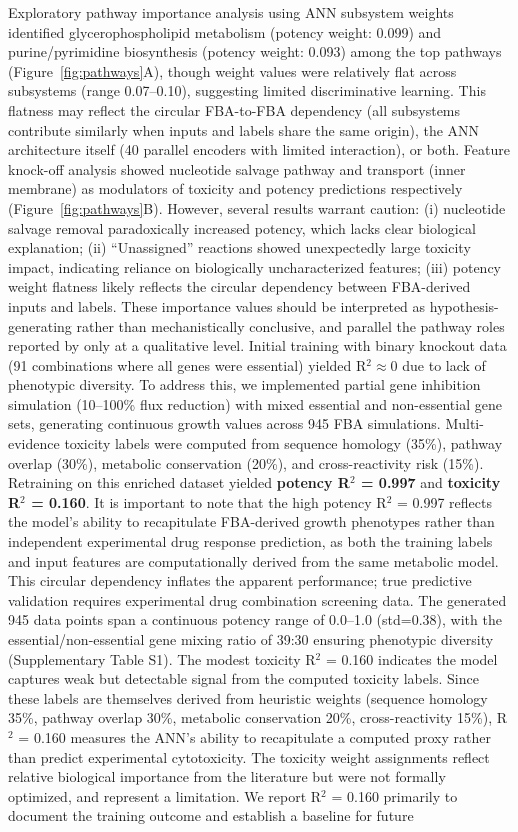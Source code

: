 \documentclass[12pt,a4paper]{article}
\begin{document}
Exploratory pathway importance analysis using ANN subsystem weights identified glycerophospholipid metabolism (potency weight: 0.099) and purine/pyrimidine biosynthesis (potency weight: 0.093) among the top pathways (Figure~\ref{fig:pathways}A), though weight values were relatively flat across subsystems (range 0.07--0.10), suggesting limited discriminative learning. This flatness may reflect the circular FBA-to-FBA dependency (all subsystems contribute similarly when inputs and labels share the same origin), the ANN architecture itself (40 parallel encoders with limited interaction), or both. Feature knock-off analysis showed nucleotide salvage pathway and transport (inner membrane) as modulators of toxicity and potency predictions respectively (Figure~\ref{fig:pathways}B). However, several results warrant caution: (i) nucleotide salvage removal paradoxically increased potency, which lacks clear biological explanation; (ii) ``Unassigned'' reactions showed unexpectedly large toxicity impact, indicating reliance on biologically uncharacterized features; (iii) potency weight flatness likely reflects the circular dependency between FBA-derived inputs and labels. These importance values should be interpreted as hypothesis-generating rather than mechanistically conclusive, and parallel the pathway roles reported by \citet{arora2026} only at a qualitative level. Initial training with binary knockout data (91 combinations where all genes were essential) yielded R$^2 \approx 0$ due to lack of phenotypic diversity. To address this, we implemented partial gene inhibition simulation (10--100\% flux reduction) with mixed essential and non-essential gene sets, generating continuous growth values across 945 FBA simulations. Multi-evidence toxicity labels were computed from sequence homology (35\%), pathway overlap (30\%), metabolic conservation (20\%), and cross-reactivity risk (15\%). Retraining on this enriched dataset yielded \textbf{potency R$^2$ = 0.997} and \textbf{toxicity R$^2$ = 0.160}. It is important to note that the high potency R$^2$ = 0.997 reflects the model's ability to recapitulate FBA-derived growth phenotypes rather than independent experimental drug response prediction, as both the training labels and input features are computationally derived from the same metabolic model. This circular dependency inflates the apparent performance; true predictive validation requires experimental drug combination screening data. The generated 945 data points span a continuous potency range of 0.0--1.0 (std=0.38), with the essential/non-essential gene mixing ratio of 39:30 ensuring phenotypic diversity (Supplementary Table S1). The modest toxicity R$^2$ = 0.160 indicates the model captures weak but detectable signal from the computed toxicity labels. Since these labels are themselves derived from heuristic weights (sequence homology 35\%, pathway overlap 30\%, metabolic conservation 20\%, cross-reactivity 15\%), R$^2$ = 0.160 measures the ANN's ability to recapitulate a computed proxy rather than predict experimental cytotoxicity. The toxicity weight assignments reflect relative biological importance from the literature but were not formally optimized, and represent a limitation. We report R$^2$ = 0.160 primarily to document the training outcome and establish a baseline for future 
\end{document}
